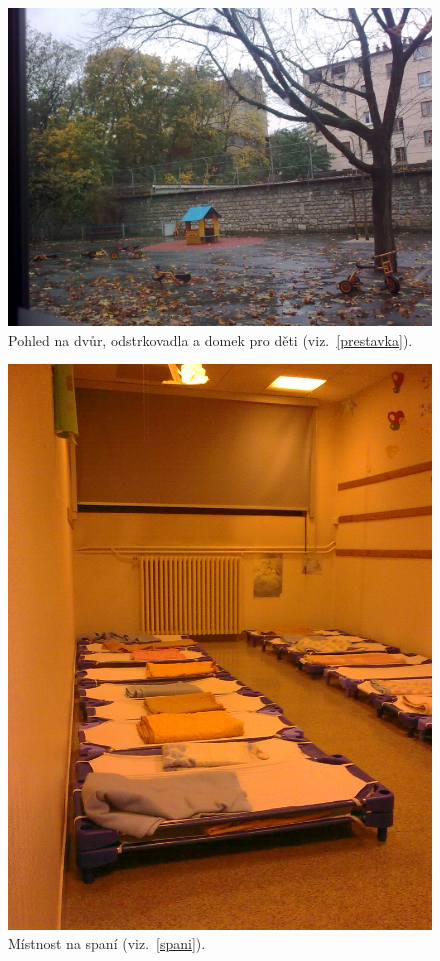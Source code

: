 	\begin{figure}[tb]
		\centering
		\includegraphics[height=0.35\textheight]{./fotky/Obr17.jpg}
		\caption{
			Pohled na dvůr, odstrkovadla a domek pro děti (viz.~\ref{prestavka}).
		}
		\label{Obr17}
	\end{figure}

	\begin{figure}[tb]
		\centering
		\includegraphics[height=0.35\textheight]{./fotky/Obr18.jpg}
		\caption{
			Místnost na spaní (viz.~\ref{spani}).
		}
		\label{Obr18}
	\end{figure}
	
